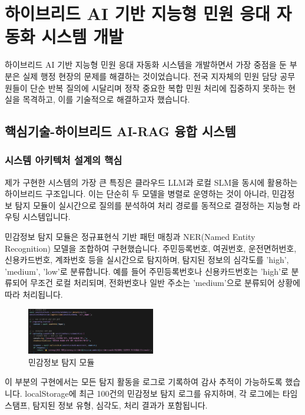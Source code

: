 \section{하이브리드 AI 기반 지능형 민원 응대 자동화 시스템 개발}
 하이브리드 AI 기반 지능형 민원 응대 자동화 시스템을 개발하면서 가장 중점을 둔 부분은 실제 행정 현장의 문제를 해결하는 것이었습니다. 전국 지자체의 민원 담당 공무원들이 단순 반복 질의에 시달리며 정작 중요한 복합 민원 처리에 집중하지 못하는 현실을 목격하고, 이를 기술적으로 해결하고자 했습니다. 


\subsection{핵심기술-하이브리드 AI-RAG 융합 시스템}

\subsubsection{시스템 아키텍처 설계의 핵심}
제가 구현한 시스템의 가장 큰 특징은 클라우드 LLM과 로컬 SLM을 동시에 활용하는 하이브리드 구조입니다. 이는 단순히 두 모델을 병렬로 운영하는 것이 아니라, 민감정보 탐지 모듈이 실시간으로 질의를 분석하여 처리 경로를 동적으로 결정하는 지능형 라우팅 시스템입니다.

민감정보 탐지 모듈은 정규표현식 기반 패턴 매칭과 NER(Named Entity Recognition) 모델을 조합하여 구현했습니다. 주민등록번호, 여권번호, 운전면허번호, 신용카드번호, 계좌번호 등을 실시간으로 탐지하며, 탐지된 정보의 심각도를 'high', 'medium', 'low'로 분류합니다. 예를 들어 주민등록번호나 신용카드번호는 'high'로 분류되어 무조건 로컬 처리되며, 전화번호나 일반 주소는 'medium'으로 분류되어 상황에 따라 처리됩니다.

\begin{figure}[H]
    \centering
    \includegraphics[width=0.5\textwidth]{1/code1.png}
    \caption{민감정보 탐지 모듈}
    \label{fig:Sensitive information detection module }
\end{figure}

이 부분의 구현에서는 모든 탐지 활동을 로그로 기록하여 감사 추적이 가능하도록 했습니다. localStorage에 최근 100건의 민감정보 탐지 로그를 유지하며, 각 로그에는 타임스탬프, 탐지된 정보 유형, 심각도, 처리 결과가 포함됩니다. 


